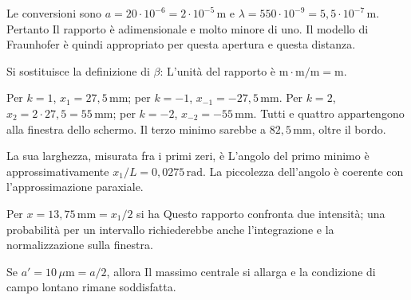 \ExSolution


Le conversioni sono \(a=20\cdot10^{-6}=2\cdot10^{-5}\,\mathrm m\) e \(\lambda=550\cdot10^{-9}=5{,}5\cdot10^{-7}\,\mathrm m\). Pertanto
Il rapporto è adimensionale e molto minore di uno. Il modello di Fraunhofer è quindi appropriato per questa apertura e questa distanza.


Si sostituisce la definizione di \(\beta\):
L’unità del rapporto è \(\mathrm m\cdot\mathrm m/\mathrm m=\mathrm m\).


Per \(k=1\), \(x_1=27{,}5\,\mathrm{mm}\); per \(k=-1\), \(x_{-1}=-27{,}5\,\mathrm{mm}\). Per \(k=2\), \(x_2=2\cdot27{,}5=55\,\mathrm{mm}\); per \(k=-2\), \(x_{-2}=-55\,\mathrm{mm}\). Tutti e quattro appartengono alla finestra dello schermo. Il terzo minimo sarebbe a \(82{,}5\,\mathrm{mm}\), oltre il bordo.


La sua larghezza, misurata fra i primi zeri, è
L’angolo del primo minimo è approssimativamente \(x_1/L=0{,}0275\,\mathrm{rad}\). La piccolezza dell’angolo è coerente con l’approssimazione paraxiale.


Per \(x=13{,}75\,\mathrm{mm}=x_1/2\) si ha
Questo rapporto confronta due intensità; una probabilità per un intervallo richiederebbe anche l’integrazione e la normalizzazione sulla finestra.


Se \(a'=10\,\mu\mathrm m=a/2\), allora
Il massimo centrale si allarga e la condizione di campo lontano rimane soddisfatta.


